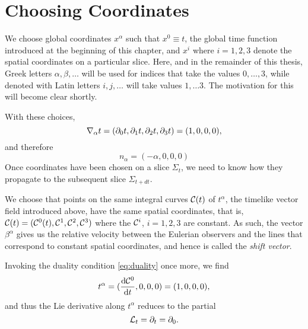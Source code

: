 \section{Choosing Coordinates}
We choose global coordinates $x^{\alpha}$ such that $x^0 \equiv t$, the global time function introduced at the beginning of this chapter, and $x^i$ where $i=1,2,3$ denote the spatial coordinates on a particular slice. Here, and in the remainder of this thesis, Greek letters $\alpha,\beta,\ldots$ will be used for indices that take the values $0,\ldots, 3$, while denoted with Latin letters $i,j,\ldots$ will take values $1,\ldots3$. The motivation for this will become clear shortly. 

With these choices,
\begin{equation}
{\nabla}_\alpha t = ({\partial}_0 t, {\partial}_1 t, {\partial}_2 t, {\partial}_3 t) = (1,0,0,0),
\end{equation}
and therefore
\begin{equation}\label{eq:n}
n_\alpha=(-\alpha,0,0,0)
\end{equation}
Once coordinates have been chosen on a slice $\Sigma_t$, we need to know how they propagate to the subsequent slice $\Sigma_{t+dt}$. 

We choose that points on the same integral curves $\mathcal{C}(t)$ of $t^\alpha$, the timelike vector field introduced above, have the same spatial coordinates, that is, $\mathcal{C}(t)=(\mathcal{C}^0(t),\mathcal{C}^1,\mathcal{C}^2,\mathcal{C}^3)$ where the $\mathcal{C}^i$, $i=1,2,3$ are constant. As such, the vector $\beta^\alpha$ gives us the relative velocity between the Eulerian observers and the lines that correspond to constant spatial coordinates, and hence is called the \textit{shift vector}. 

Invoking the duality condition \ref{eq:duality} once more, we find
\begin{equation}\label{eq:tcomp}
t^\alpha=(\frac{{\mbox{d}} \mathcal{C}^0}{{\mbox{d}} t},0,0,0)=(1,0,0,0),
\end{equation}
and thus the Lie derivative along $t^\alpha$ reduces to the partial
\begin{equation}
{\mathcal{L}}_t={\partial}_t={\partial}_0.
\end{equation}

